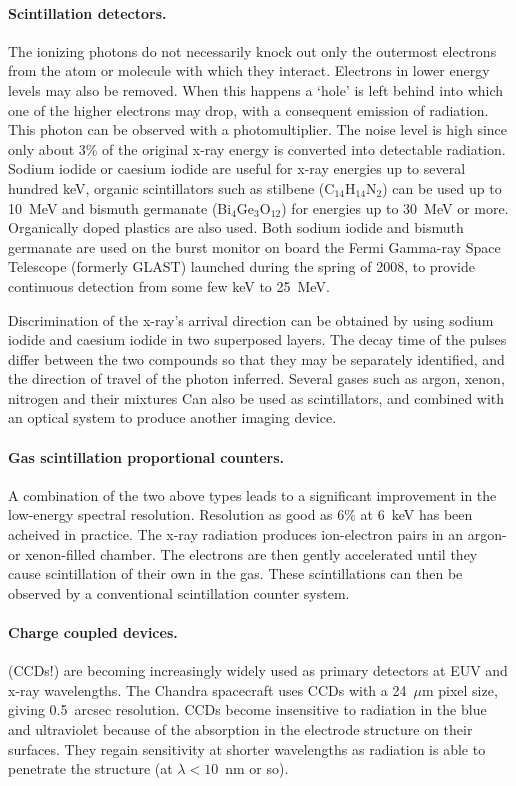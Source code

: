 \paragraph{Scintillation detectors.} The ionizing photons do not necessarily knock 
out only the outermost electrons from the atom or molecule with which they 
interact. Electrons in lower energy levels may also be removed. When this 
happens a `hole' is left behind into which one of the higher electrons may
drop, with a consequent emission of radiation. This photon can be observed
with a photomultiplier. 
The noise level is high since only about 3\% of the original x-ray energy
is converted into detectable radiation. Sodium iodide or caesium iodide are 
useful for x-ray energies up to several hundred keV, organic scintillators
such as stilbene (C$_{14}$H$_{14}$N$_2$) can be used up to 10~MeV and bismuth
germanate (Bi$_4$Ge$_3$O$_{12}$) for energies up to 30~MeV or more. Organically
doped plastics are also used. Both sodium iodide and bismuth germanate are used
on the burst monitor on board the Fermi Gamma-ray Space Telescope (formerly
GLAST) launched during the spring of 2008, to provide continuous detection
from some few keV to 25~MeV. 

Discrimination of the x-ray's arrival direction can be obtained by using 
sodium iodide and caesium iodide in two superposed layers. The decay time
of the pulses differ between the two compounds so that they may be 
separately identified, and the direction of travel of the photon inferred.
Several gases such as argon, xenon, nitrogen and their mixtures Can also
be used as scintillators, and combined with an optical system to produce
another imaging device.

\paragraph{Gas scintillation proportional counters.} A combination of the two
above types leads to a significant improvement in the low-energy spectral
resolution. Resolution as good as 6\% at 6~keV has been acheived in practice.
The x-ray radiation produces ion-electron pairs in an argon- or xenon-filled
chamber. The electrons are then gently accelerated until they cause 
scintillation of their own in the gas. These scintillations can then be
observed by a conventional scintillation counter system. 

\paragraph{Charge coupled devices.} (CCDs!) are becoming increasingly widely used as 
primary detectors at EUV and x-ray wavelengths. The Chandra spacecraft 
uses CCDs with a 24~$\mu$m pixel size, giving 0.5~arcsec resolution. CCDs
become insensitive to radiation in the blue and ultraviolet because of the 
absorption in the electrode structure on their surfaces. They regain sensitivity at
shorter wavelengths as radiation is able to penetrate the structure
 (at $\lambda<10$~nm or so).

